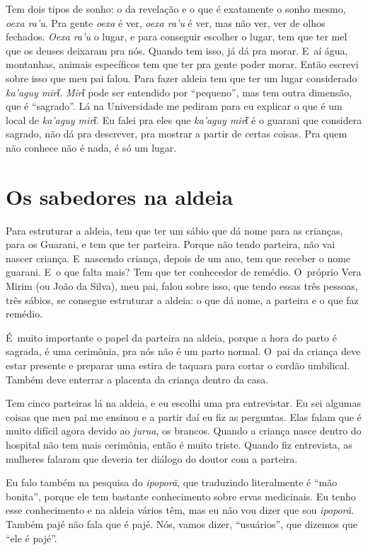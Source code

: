Tem dois tipos de sonho: o da revelação e o que é exatamente o sonho
mesmo, \emph{oexa ra’u}. Pra gente \emph{oexa} é ver, \emph{oexa ra’u} é ver, mas não ver,
ver de olhos fechados. \emph{Oexa ra’u} o lugar, e para conseguir escolher o
lugar, tem que ter mel que os deuses deixaram pra nós. Quando tem isso,
já dá pra morar. E~aí água, montanhas, animais específicos tem que ter
pra gente poder morar. Então escrevi sobre isso que meu pai falou. Para
fazer aldeia tem que ter um lugar considerado \emph{ka’aguy mirῖ}. \emph{Mirῖ} pode ser
entendido por ``pequeno'', mas tem outra dimensão, que é ``sagrado''.
Lá na Universidade me pediram para eu explicar o que é um local de \emph{ka’aguy
mirῖ}. Eu falei pra eles que \emph{ka’aguy mirῖ} é o guarani que considera sagrado, não dá pra descrever, pra mostrar a partir de certas coisas.
Pra quem não conhece não é nada, é só um lugar.

\section{Os sabedores na aldeia}

Para estruturar a aldeia, tem que ter um sábio que dá nome para as
crianças, para os Guarani, e tem que ter parteira. Porque não tendo
parteira, não vai nascer criança. E~nascendo criança, depois de um ano,
tem que receber o nome guarani. E~o que falta mais? Tem que ter
conhecedor de remédio. O~próprio Vera Mirim (ou João da Silva), meu
pai, falou sobre isso, que tendo essas três pessoas, três sábios, se
consegue estruturar a aldeia: o que dá nome, a parteira e o que faz
remédio.

É~muito importante o papel da parteira na aldeia, porque a hora do parto
é sagrada, é uma cerimônia, pra nós não é um parto normal. O~pai da
criança deve estar presente e preparar uma estira de taquara para
cortar o cordão umbilical. Também deve enterrar a placenta da criança
dentro da casa.

Tem cinco parteiras lá na aldeia, e eu escolhi uma pra entrevistar. Eu
sei algumas coisas que meu pai me ensinou e a partir daí eu fiz as
perguntas. Elas falam que é muito difícil agora devido ao \emph{jurua}, os
brancos. Quando a criança nasce dentro do hospital não tem mais
cerimônia, então é muito triste. Quando fiz entrevista, as mulheres
falaram que deveria ter diálogo do doutor com a parteira. 

Eu falo também na pesquisa do \emph{ipoporã}, que traduzindo literalmente é
``mão bonita'', porque ele tem bastante conhecimento sobre ervas
medicinais. Eu tenho esse conhecimento e na aldeia vários têm, mas eu
não vou dizer que sou \emph{ipoporã}. Também pajé não fala que é pajé. Nós,
vamos dizer, ``usuários'', que dizemos que ``ele é pajé''.

